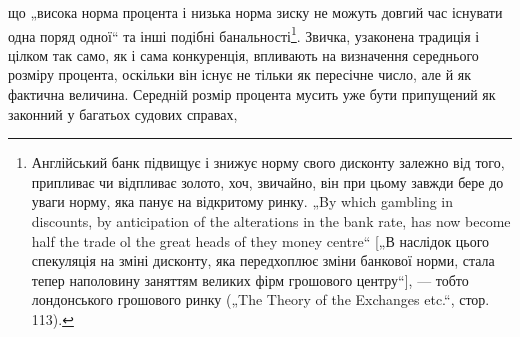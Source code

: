 що „висока норма процента і низька норма зиску не можуть
довгий час існувати одна поряд одної“ та інші подібні банальності\footnote{
Англійський банк підвищує і знижує норму свого дисконту залежно від
того, припливає чи відпливає золото, хоч, звичайно, він при цьому завжди бере
до уваги норму, яка панує на відкритому ринку. „By which gambling in discounts,
by anticipation of the alterations in the bank rate, has now become half the trade
ol the great heads of they money centre“ [„В наслідок цього спекуляція на зміні
дисконту, яка передхоплює зміни банкової норми, стала тепер наполовину
заняттям великих фірм грошового центру“], — тобто лондонського грошового
ринку („The Theory of the Exchanges etc.“, стор. 113).
}.
Звичка, узаконена традиція і~ цілком так само, як
і сама конкуренція, впливають на визначення середнього розміру
процента, оскільки він існує не тільки як пересічне число,
але й як фактична величина. Середній розмір процента мусить
уже бути припущений як законний у багатьох судових справах,
\parbreak{}  %

